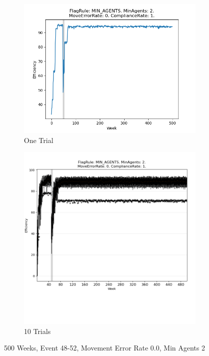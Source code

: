 \documentclass{article}%
\begin{document}
%


\begin{figure}[!htb]%
\begin{subfigure}[b]{0.45\linewidth}%
\includegraphics[width=\linewidth]{1003fr_MIN_AGENTS_ma_2_er_0_cr_1_t1.png}%
\caption{One Trial}%
\end{subfigure}%
\begin{subfigure}[b]{0.45\linewidth}%
\includegraphics[clip,width=\linewidth,trim=0 4cm 0 0]{1003fr_MIN_AGENTS_ma_2_er_0_cr_1_t10.png}%
\caption{10 Trials}%
\end{subfigure}%
\caption{500 Weeks, Event 48{-}52, Movement Error Rate 0.0, Min Agents 2}%
\end{figure}
\end{document}

